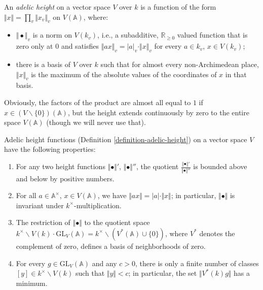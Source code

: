 \begin{definition}
 \label{definition-adelic-height}
An \emph{adelic height} on a vector space $V$ over $k$ is a function of the form $\Vert x\Vert = \prod_v \Vert x_v \Vert_v$ on $V(\mathbb A)$, where:
\begin{itemize}
 \item $\Vert \bullet \Vert_v$ is a norm on $V(k_v)$, i.e., a subadditive, $\mathbb R_{\ge 0}$ valued function that is zero only at $0$ and satisfies $\Vert a x \Vert_v = |a|_v \cdot \Vert x \Vert_v$ for every $a\in k_v$, $x\in V(k_v)$;
 \item there is a basis of $V$ over $k$ such that for almost every non-Archimedean place, $\Vert x\Vert_v$ is the maximum of the absolute values of the coordinates of $x$ in that basis.
\end{itemize}
\end{definition}

Obviously, the factors of the product are almost all equal to $1$ if $x\in (V\smallsetminus\{0\})(\mathbb A)$, but the height extends continuously by zero to the entire space $V(\mathbb A)$ (though we will never use that).


\begin{lemma}
 \label{lemma-height-functions}
Adelic height functions (Definition \ref{definition-adelic-height}) on a vector space $V$ have the following properties:
\begin{enumerate}
 \item For any two height functions $\Vert \bullet \Vert'$, $\Vert\bullet\Vert''$, the quotient $\frac{\Vert\bullet\Vert'}{\Vert\bullet\Vert''}$ is bounded above and below by positive numbers.
 \item For all $a\in \mathbb A^\times$, $x\in V(\mathbb A)$, we have $\Vert a x \Vert = |a|\cdot \Vert x \Vert$; in particular, $\Vert \bullet \Vert$ is invariant under $k^\times$-multiplication.
 \item The restriction of $\Vert\bullet\Vert$ to the quotient space $k^\times \backslash V(k)\cdot \text{GL}_V(\mathbb A) = k^\times\backslash (V^*(\mathbb A)\cup \{0\})$, where $V^*$ denotes the complement of zero, defines a basis of neighborhoods of zero.
 \item For every $g\in \text{GL}_V(\mathbb A)$ and any $c>0$, there is only a finite number of classes $[y]\in k^\times \backslash V(k)$ such that $\Vert y\Vert <c$; in particular, the set $\Vert V^*(k)g\Vert$ has a minimum.
\end{enumerate}

\end{lemma}

